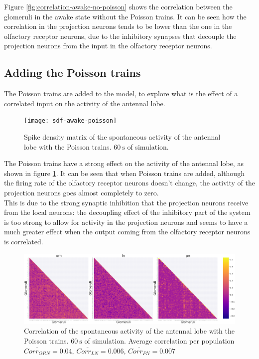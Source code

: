 Figure \ref{fig:correlation-awake-no-poisson} shows the correlation between the glomeruli in the awake state without the Poisson trains.
It can be seen how the correlation in the projection neurons tends to be lower than the one in the olfactory receptor neurons, due to the inhibitory synapses that decouple the projection neurons from the input in the olfactory receptor neurons.

  \subsection{Adding the Poisson trains}
  The Poisson trains are added to the model, to explore what is the effect of a correlated input on the activity of the antennal lobe.

  \begin{figure}
    \centering
    \texttt{[image: sdf-awake-poisson]}
    \caption{Spike density matrix of the spontaneous activity of the antennal lobe with the Poisson trains. $\SI{60}{\second}$ of simulation.}
    \label{fig:sdf-awake-poisson}
  \end{figure}

  The Poisson trains have a strong effect on the activity of the antennal lobe, as shown in figure \ref{fig:sdf-awake-poisson}.
  It can be seen that when Poisson trains are added, although the firing rate of the olfactory receptor neurons doesn't change, the activity of the projection neurons goes almost completely to zero.\\
  This is due to the strong synaptic inhibition that the projection neurons receive from the local neurons: the decoupling effect of the inhibitory part of the system is too strong to allow for activity in the projection neurons and seems to have a much greater effect when the output coming from the olfactory receptor neurons is correlated.

  \begin{figure}
    \centering
    \includegraphics[width=\textwidth]{correlation-awake-poisson}
    \caption{Correlation of the spontaneous activity of the antennal lobe with the Poisson trains. $\SI{60}{\second}$ of simulation. Average correlation per population $\overline{Corr_{ORN}} = 0.04$, $\overline{Corr_{LN}} = 0.006$, $\overline{Corr_{PN}} = 0.007$}
    \label{fig:correlation-awake-poisson}
  \end{figure}

